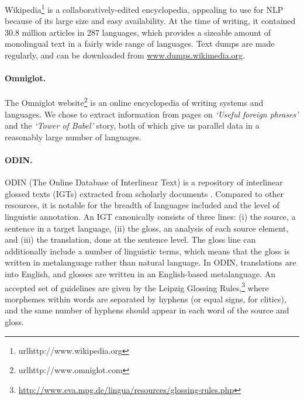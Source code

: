 Wikipedia\footnote{url{http://www.wikipedia.org}} is a collaboratively-edited encyclopedia, appealing to use for NLP because of its large size and easy availability. At the time of writing, it contained 30.8 million articles in 287 languages, which provides a sizeable amount of monolingual text in a fairly wide range of languages. Text dumps are made regularly, and can be downloaded from \url{www.dumps.wikimedia.org}.

\paragraph{Omniglot.}

The Omniglot website\footnote{url{http://www.omniglot.com}} is an online encyclopedia of writing systems and languages. We chose to extract information from pages on \emph{`Useful foreign phrases'} and the \emph{`Tower of Babel'} story, both of which give us parallel data in a reasonably large number of languages. %


\paragraph{ODIN.} \label{sec:odin}

ODIN (The Online Database of Interlinear Text) is a repository of
interlinear glossed texts (IGTs) extracted from scholarly documents
\cite{lewis2006odin,lewis2010odin}.  Compared to other resources, it
is notable for the breadth of languages included and the level of
linguistic annotation.  An IGT canonically consists of three lines:
(i) the source, a sentence in a target language, (ii) the gloss, an
analysis of each source element, and (iii) the translation,
done at the sentence level. The gloss line can additionally include a
number of linguistic terms, which means that the gloss 
is written in metalanguage rather than natural language.  In ODIN, translations are into English, and glosses
are written in an English-based metalanguage.  An accepted set of
guidelines are given by the Leipzig Glossing
Rules,\footnote{\url{http://www.eva.mpg.de/lingua/resources/glossing-rules.php}}
where morphemes within words are separated by hyphens (or equal signs,
for clitics), and the same number of hyphens should appear in each
word of the source and gloss.

